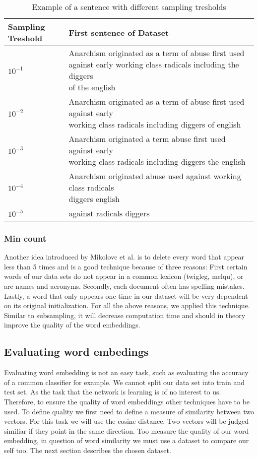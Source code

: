 \begin{table*}[tb]\centering
\caption{Example of a sentence with different sampling tresholds}
    \begin{tabular}{l l}%
        \toprule
Sampling Treshold & First sentence of Dataset \\ 
        \midrule%
$10^{-1}$ & \makecell[l]{Anarchism originated as a term of abuse first used against early working class radicals including the diggers\\ of the english} \\ \hline
$10^{-2}$  & \makecell[l]{ Anarchism originated as a term of abuse first used against early \\ working class radicals including diggers of english} \\ \hline
$10^{-3}$ & \makecell[l]{Anarchism originated a term abuse first used against early \\ working class radicals including diggers the english}\\ \hline
$10^{-4}$ &\makecell[l]{ Anarchism originated abuse used against working class radicals\\ diggers english} \\ \hline
$10^{-5}$ & against radicals diggers \\ \hline        
        \midrule%
   \end{tabular}%
\label{table:treshold_examples}
\end{table*}
\fi


\subsubsection{Min count}
Another idea introduced by Mikolove et al. \citep{mikolov2} is to delete every word that appear less than 5 times and is a good technique because of three reasons: First certain words of our data sets do not appear in a common lexicon (twigleg, melqu), or are names and acronyms. Secondly, each document often has spelling mistakes. Lastly, a word that only appears one time in our dataset will be very dependent on its original initialization. For all the above reasons, we applied this technique. Similar to subsampling, it will decrease computation time and  should in theory improve the quality of the word embeddings.

\subsection{Evaluating word embedings}
Evaluating word embedding is not an easy task, such as evaluating the accuracy of a common classifier for example. We cannot split our data set into train and test set. As the task that the network is learning is of no interest to us. Therefore, to ensure the quality of word embeddings other techniques have to be used. To define quality we first need to define a measure of similarity between two vectors. For this task we will use the cosine distance. Two vectors will be judged similiar if they point in the same direction. Too measure the quality of our word embedding, in question of word similarity we must use a dataset to compare our self too. The  next section describes the chosen dataset. 


